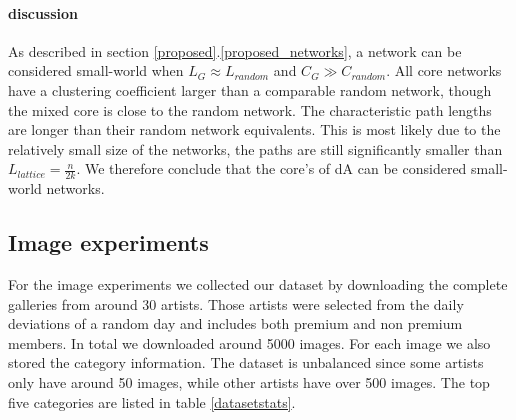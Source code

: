 \paragraph{discussion}
As described in section \ref{proposed}.\ref{proposed_networks}, a network can be considered small-world when $L_G\approx L_{random}$ and $C_G \gg C_{random}$. All core networks have a clustering coefficient larger than a comparable random network, though the mixed core is close to the random network. The characteristic path lengths are longer than their random network equivalents. This is most likely due to the relatively small size of the networks, the paths are still significantly smaller than $L_{lattice}=\frac{n}{2k}$. We therefore conclude that the core's of dA can be considered small-world networks.  



\subsection{Image experiments}
For the image experiments we collected our dataset by downloading the complete galleries from around 30 artists.
Those artists were selected from the daily deviations of a random day and includes both premium and non premium members.
In total we downloaded around 5000 images. 
For each image we also stored the category information.
The dataset is unbalanced since some artists only have around 50 images, while other artists have over 500 images.
The top five categories are listed in table \ref{datasetstats}.


